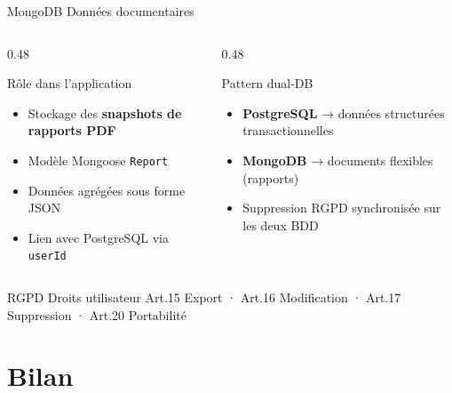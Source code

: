 \documentclass[aspectratio=169]{beamer}
\begin{document}
\begin{frame}{MongoDB  Données documentaires}
  \begin{columns}[t]
    \begin{column}{0.48\textwidth}
      \begin{block}{Rôle dans l'application}
        \begin{itemize}
          \item Stockage des \textbf{snapshots de rapports PDF}
          \item Modèle Mongoose \texttt{Report}
          \item Données agrégées sous forme JSON
          \item Lien avec PostgreSQL via \texttt{userId}
        \end{itemize}
      \end{block}
    \end{column}
    \begin{column}{0.48\textwidth}
      \begin{block}{Pattern dual-DB}
        \begin{itemize}
          \item \textbf{PostgreSQL} → données structurées transactionnelles
          \item \textbf{MongoDB} → documents flexibles (rapports)
          \item Suppression RGPD synchronisée sur les deux BDD
        \end{itemize}
      \end{block}
    \end{column}
  \end{columns}
  \vspace{0.4cm}
  \begin{block}{RGPD  Droits utilisateur}
    \centering\small
    Art.15 Export · Art.16 Modification · Art.17 Suppression · Art.20 Portabilité
  \end{block}
\end{frame}

\section{Bilan}
\end{document}
